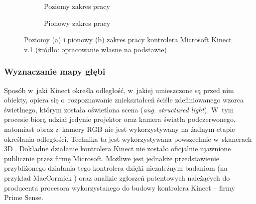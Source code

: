 \begin{savenotes}
	\begin{figure}[!htb]
		\centering
		\begin{subfigure}[b]{0.5\textwidth}
			\centering
			
			\caption{Poziomy zakres pracy}
			\label{fig:kinect:range:a}
		\end{subfigure} \hfill
		\begin{subfigure}[b]{0.6\textwidth}
			\centering
			
			\caption{Pionowy zakres pracy}
			\label{fig:kinect:range:b}
		\end{subfigure} \hfill
		\begin{subfigure}[p]{\textwidth}
			\hfill
			               
		\end{subfigure}
																											
		\caption[Poziomy i pionowy zakres pracy kontrolera Microsoft Kinect v.1]{Poziomy (a) i pionowy (b) zakres pracy kontrolera Microsoft Kinect v.1 (żródło: opracowanie własne na podstawie)}
		\label{fig:characteristics:kinect:range}	
	\end{figure}
\end{savenotes} 
																															
\subsubsection*{Wyznaczanie mapy głębi}
Sposób w~jaki Kinect określa odległość, w~jakiej umieszczone są przed nim obiekty, opiera się o~rozpoznawanie zniekształceń ściśle zdefiniowanego wzorca świetlnego, którym została oświetlona scena (\emph{ang. structured light}). W~tym procesie biorą udział jedynie projektor oraz kamera światła podczerwonego, natomiast obraz z~kamery RGB nie jest wykorzystywany na żadnym etapie określania odległości. Technika ta jest wykorzystywana powszechnie w~skanerach 3D {}. Dokładne działanie kontrolera Kinect nie zostało oficjalnie ujawnione publicznie przez firmę Microsoft. Możliwe jest jednakże przedstawienie przybliżonego działania tego kontrolera dzięki niezależnym badaniom (na przykład MacCormick \cite{MacCormick2011}) oraz analizie zgłoszeń patentowych \cite{patent:20080106746,patent:20100020078,patent:20100118123} należących do producenta procesora wykorzystanego do budowy kontrolera Kinect -- firmy Prime Sense.
																															
